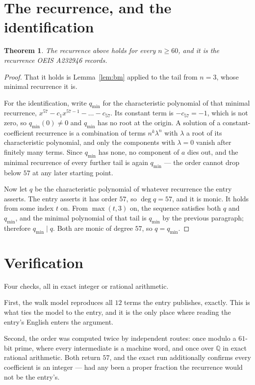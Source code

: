\documentclass[11pt,a4paper]{article}
\theoremstyle{plain}
\newtheorem{theorem}{Theorem}
\theoremstyle{definition}
\begin{document}
\section{The recurrence, and the identification}

\begin{theorem}
The recurrence above holds for every $n\ge60$, and it is the recurrence OEIS A232946 records.
\end{theorem}

\begin{proof}
That it holds is Lemma~\ref{lem:bm} applied to the tail from $n=3$, whose minimal
recurrence it is.

For the identification, write $q_{\min}$ for the characteristic polynomial of that minimal
recurrence, $x^{57}-c_1x^{57-1}-\dots-c_{57}$. Its constant term is
$-c_{57}=-1$, which is not zero, so $q_{\min}(0)\neq0$ and $q_{\min}$ has no
root at the origin. A solution of a constant-coefficient recurrence is a combination of terms
$n^{k}\lambda^{n}$ with $\lambda$ a root of its characteristic polynomial, and only the
components with $\lambda=0$ vanish after finitely many terms. Since $q_{\min}$ has none, no
component of $a$ dies out, and the minimal recurrence of every further tail is again
$q_{\min}$ --- the order cannot drop below $57$ at any later starting point.

Now let $q$ be the characteristic polynomial of whatever recurrence the entry asserts. The
entry asserts it has order $57$, so $\deg q=57$, and it is monic. It holds from some
index $t$ on. From $\max(t,3)$ on, the sequence satisfies both $q$ and $q_{\min}$, and
the minimal polynomial of that tail is $q_{\min}$ by the previous paragraph; therefore
$q_{\min}\mid q$. Both are monic of degree $57$, so $q=q_{\min}$.
\end{proof}

\section{Verification}

Four checks, all in exact integer or rational arithmetic.

First, the walk model reproduces all $12$ terms the entry publishes, exactly. This is
what ties the model to the entry, and it is the only place where reading the entry's English
enters the argument.

Second, the order was computed twice by independent routes: once modulo a $61$-bit prime, where
every intermediate is a machine word, and once over $\mathbb{Q}$ in exact rational arithmetic.
Both return $57$, and the exact run additionally confirms every coefficient is an integer
--- had any been a proper fraction the recurrence would not be the entry's.
\end{document}
